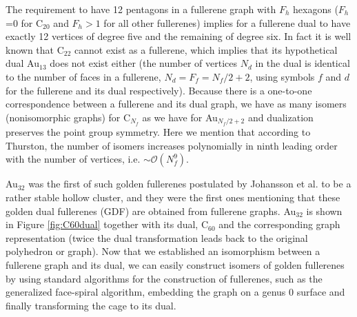 The requirement to have 12 pentagons in a fullerene graph with $F_h$ hexagons
($F_h$=0 for C$_{20}$ and $F_h > 1$ for all other fullerenes) implies for a
fullerene dual to have exactly 12 vertices of degree five and the remaining of
degree six. In fact it is well known that C$_{22}$ cannot exist as a
fullerene,\autocite{Grunbaum_numberhexagonssimplicity_1963} which implies that
its hypothetical dual Au$_{13}$ does not exist either (the number of vertices
$N_d$ in the dual is identical to the number of faces in a fullerene,
$N_d=F_f=N_f/2+2$,\autocite{Schwerdtfeger_topologyfullerenes_2015} using
symbols $f$ and $d$ for the fullerene and its dual respectively). Because there
is a one-to-one correspondence between a fullerene and its dual graph, we have
as many isomers (nonisomorphic graphs) for C$_{N_f}$ as we have for
Au$_{N_f/2+2}$ and dualization preserves the point group symmetry. Here we
mention that according to Thurston, the number of isomers increases
polynomially in ninth leading order with the number of vertices, i.e.
$\sim\mathcal{O}({N_f^9})$.\autocite{Thurston_Shapespolyhedratriangulations_1998} 

Au$_{32}$ was the first of such golden fullerenes postulated by Johansson et
al. to be a rather stable hollow cluster, and they were the first ones
mentioning that these golden dual fullerenes (GDF) are obtained from fullerene
graphs.\autocite{Johansson_Au3224CaratGolden_2004} Au$_{32}$ is shown in Figure
\ref{fig:C60dual} together with its dual, C$_{60}$ and the corresponding graph
representation (twice the dual transformation leads back to the original
polyhedron or graph). Now that we established an isomorphism between a
fullerene graph and its dual, we can easily construct isomers of golden
fullerenes by using standard algorithms for the construction of fullerenes,
such as the generalized face-spiral
algorithm,\autocite{Fowler-atlas-2006,Schwerdtfeger_Programfullerenesoftware_2013,Wirz-2014,Schwerdtfeger_topologyfullerenes_2015}
embedding the graph on a genus 0 surface and finally transforming the cage to
its dual.

